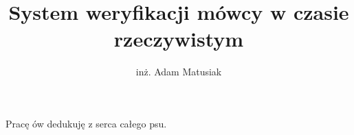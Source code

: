\documentclass[
  printmode
]{mgr}
\title{System weryfikacji mówcy w czasie rzeczywistym}
\author{inż. Adam Matusiak}
\begin{document}
\maketitle

\dedication{6cm}{Pracę ów dedukuję z serca całego psu.}



\tableofcontents
\end{document}
